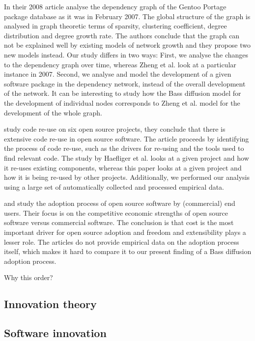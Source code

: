 \documentclass[smallextended,final]{svjour3}
\begin{document}
In their 2008 article \citet{zheng08} analyse the dependency graph of the Gentoo Portage package database as it was in February 2007. The global structure of the graph is analysed in graph theoretic terms of sparsity, clustering coefficient, degree distribution and degree growth rate. The authors conclude that the graph can not be explained well by existing models of network growth and they propose two new models instead. Our study differs in two ways: First, we analyse the changes to the dependency graph over time, whereas Zheng et al. look at a particular instance in 2007. Second, we analyse and model the development of a given software package in the dependency network, instead of the overall development of the network. It can be interesting to study how the Bass diffusion model for the development of individual nodes corresponds to Zheng et al. model for the development of the whole graph.

\citet{haefliger08} study code re-use on six open source projects, they conclude that there is extensive code re-use in open source software. The article proceeds by identifying the process of code re-use, such as the drivers for re-using and the tools used to find relevant code. The study by Haefliger et al. looks at a given project and how it  re-uses existing components, whereas this paper looks at a given project and how it is being re-used by other projects. Additionally, we performed our analysis using a large set of automatically collected and processed empirical data.

\citet{dedrick04} and \citet{chen06} study the adoption process of open source software by (commercial) end users. Their focus is on the competitive economic strengths of open source software versus commercial software. The conclusion is that cost is the most important driver for open source adoption and freedom and extensibility plays a lesser role. The articles do not provide empirical data on the adoption process itself, which makes it hard to compare it to our present finding of a Bass diffusion adoption process.


Why this order?

\subsection{Innovation theory}


\subsection{Software innovation}
\end{document}

